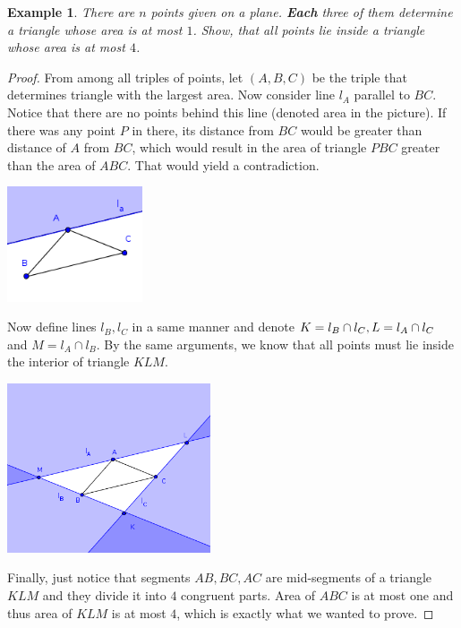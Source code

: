 \documentclass[12pt]{article}
\newtheorem{theorem}{Example}
\begin{document}
\begin{theorem}
There are $n$ points given on a plane. \textbf{Each} three of them determine a triangle whose area is at most $1$. Show, that all points lie inside a triangle whose area is at most $4$.  
\end{theorem}

\begin{proof}
From among all triples of points, let $(A, B, C)$ be the triple that determines triangle with the largest area. Now consider line $l_{A}$ parallel to $BC$. Notice that there are no points behind this line (denoted area in the picture). 
If there was any point $P$ in there, its distance from $BC$ would be greater than distance of $A$ from $BC$, which would result in the area of triangle $PBC$ greater than the area of $ABC$. That would yield a contradiction.
\begin{center}
\includegraphics[width=0.3\textwidth]{img1}
\end{center}
Now define lines $l_{B}, l_{C}$ in a same manner and denote $K = l_{B} \cap l_{C},\\ L = l_{A} \cap l_{C}$ and $M = l_{A} \cap l_{B}$. By the same arguments, we know that all points must lie inside the interior of triangle $KLM$. 
\begin{center}
\includegraphics[width=0.45\textwidth]{img2}
\end{center}
Finally, just notice that segments $AB, BC, AC$ are mid-segments of a triangle $KLM$ and they divide it into $4$ congruent parts. Area of $ABC$ is at most one and thus area of $KLM$ is at most $4$, which is exactly what we wanted to prove.
\end{proof}
\end{document}
